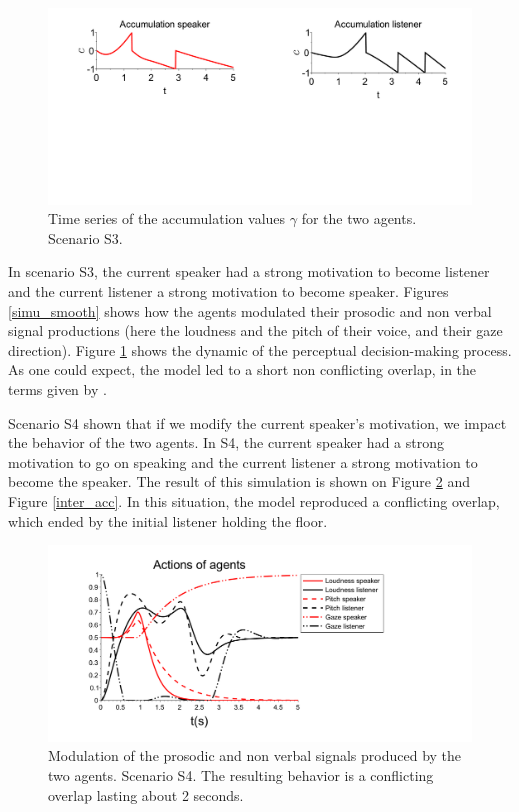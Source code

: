 \begin{figure}[t]
  \centering
  \includegraphics[width=\linewidth]{figure/smooth-transition_accumulation_small.pdf}
  \caption{Time series of the accumulation values $\gamma$ for the two agents. Scenario S3.}
  \label{smooth_acc}
\end{figure}


In scenario S3, the current speaker had a strong motivation to become listener and the current listener a strong motivation to become speaker. Figures \ref{simu_smooth} shows how the agents modulated their prosodic and non verbal signal productions (here the loudness and the pitch of their voice, and their gaze direction). Figure \ref{smooth_acc} shows the dynamic of the perceptual decision-making process. As one could expect, the model led to a short non conflicting overlap, in the terms given by \citep{schegloff_overlapping_2000}. 

Scenario S4 shown that if we modify the current speaker's motivation, we impact the behavior of the two agents. In S4, the current speaker had a strong motivation to go on speaking and the current listener a strong motivation to become the speaker. The result of this simulation is shown on Figure \ref{simu_interruption} and  Figure \ref{inter_acc}. In this situation, the model reproduced a conflicting overlap, which ended by the initial listener holding the floor.  

\begin{figure}
  \centering
  \includegraphics[width=\linewidth]{figure/emerg_sc1.pdf}
  \caption{Modulation of the prosodic and non verbal signals produced by the two agents. Scenario S4. The resulting behavior is a conflicting overlap lasting about 2 seconds.}
  \label{simu_interruption}
\end{figure}

